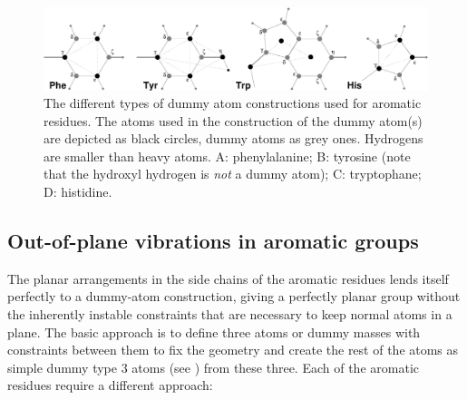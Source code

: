 \begin{figure}
\centerline{\includegraphics[width=15cm]{plots/dumaro}}
\caption[Dummy atom constructions for aromatic residues.]{The
different types of dummy atom constructions used for aromatic
residues. The atoms used in the construction of the dummy atom(s) are
depicted as black circles, dummy atoms as grey ones. Hydrogens are
smaller than heavy atoms. {\sf A}: phenylalanine; {\sf B}: tyrosine
(note that the hydroxyl hydrogen is {\em not} a dummy atom); {\sf C}:
tryptophane; {\sf D}: histidine.}
\label{fig:dumaro}
\end{figure}

\subsection{Out-of-plane vibrations in aromatic groups}
\label{sec:dummyaro}
The planar arrangements in the side chains of the aromatic residues
lends itself perfectly to a dummy-atom construction, giving a
perfectly planar group without the inherently instable constraints
that are necessary to keep normal atoms in a plane. The basic approach
is to define three atoms or dummy masses with constraints between them
to fix the geometry and create the rest of the atoms as simple dummy
type 3 atoms (see ) from these three. Each of
the aromatic residues require a different approach:

